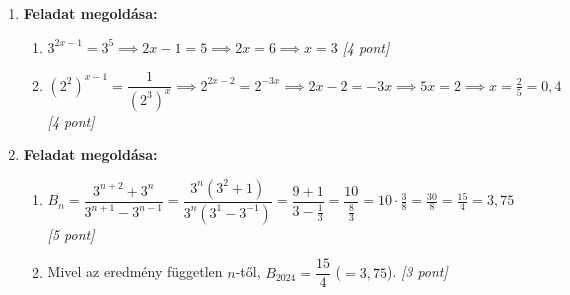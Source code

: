 \documentclass[11pt,a4paper]{article}
\begin{document}
\begin{enumerate}
    \item \textbf{Feladat megoldása:}
    \begin{enumerate}
        \item[a)] $3^{2x-1} = 3^5 \implies 2x - 1 = 5 \implies 2x = 6 \implies x = 3$ \hfill \textit{[4 pont]}
        \item[b)] $(2^2)^{x-1} = \dfrac{1}{(2^3)^x} \implies 2^{2x-2} = 2^{-3x} \implies 2x - 2 = -3x \implies 5x = 2 \implies x = \frac{2}{5} = 0,4$ \hfill \textit{[4 pont]}
    \end{enumerate}

    \item \textbf{Feladat megoldása:}
    \begin{enumerate}
        \item[a)] $B_n = \dfrac{3^{n+2} + 3^n}{3^{n+1} - 3^{n-1}} = \dfrac{3^n(3^2 + 1)}{3^n(3^1 - 3^{-1})} = \dfrac{9 + 1}{3 - \frac{1}{3}} = \dfrac{10}{\frac{8}{3}} = 10 \cdot \frac{3}{8} = \frac{30}{8} = \frac{15}{4} = 3,75$ \hfill \textit{[5 pont]}
        \item[b)] Mivel az eredmény független $n$-től, $B_{2024} = \dfrac{15}{4}$ ($=3,75$). \hfill \textit{[3 pont]}
    \end{enumerate}
\end{enumerate}
\end{document}
